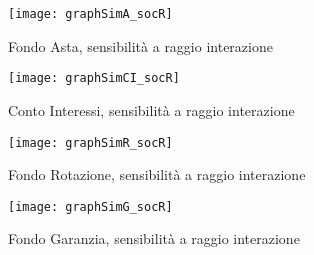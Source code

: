 \documentclass[12pt,a4paper,openright,twoside]{report}
\begin{document}
\begin{figure}[H]
	\centering
	\texttt{[image: graphSimA\_socR]}
	\caption{Fondo Asta, sensibilità a raggio interazione}
	\label{graphAsocR}
\end{figure}

\begin{figure}[hbt]
	\centering
	\texttt{[image: graphSimCI\_socR]}
	\caption{Conto Interessi, sensibilità a raggio interazione}
	\label{graphCIsocR}
\end{figure}

\begin{figure}[H]
	\centering
	\texttt{[image: graphSimR\_socR]}
	\caption{Fondo Rotazione, sensibilità a raggio interazione}
	\label{graphRsocR}
\end{figure}

\begin{figure}[hbt]
	\centering
	\texttt{[image: graphSimG\_socR]}
	\caption{Fondo Garanzia, sensibilità a raggio interazione}
	\label{graphGsocR}
\end{figure}


\nocite{*}


\end{document}
